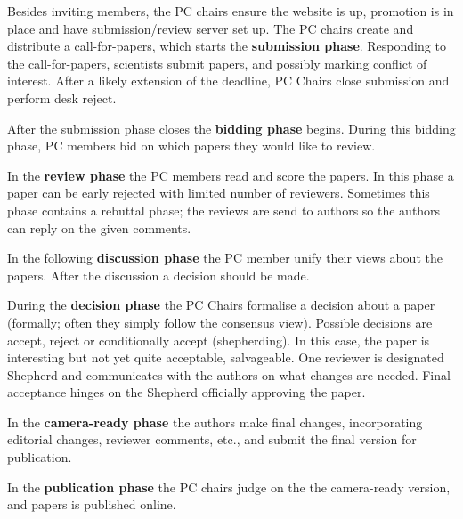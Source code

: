 \documentclass{ou-report}
\newcommand{\outline}[1]{{\color{blue} #1}}
\begin{document}
Besides inviting members, the PC chairs ensure the website is up, promotion 
is in place and have submission/review server set up.
The PC chairs create and distribute a call-for-papers, which starts the 
\textbf{submission phase}.
Responding to the call-for-papers, scientists submit papers, and possibly 
marking conflict of interest. 
After a likely extension of the deadline, PC Chairs close submission and 
perform desk reject.

After the submission phase closes the \textbf{bidding phase} begins. During 
this bidding phase, PC members bid on which papers they would like to review.

In the \textbf{review phase} the PC members read and score the papers. In this 
phase a paper can be early rejected with limited number of reviewers. Sometimes 
this phase contains a rebuttal phase; the reviews are send to authors so the 
authors can reply on the given comments.

In the following \textbf{discussion phase} the PC member unify their views about 
the papers. After the discussion a decision should be made.

During the \textbf{decision phase} the PC Chairs formalise a decision about a 
paper (formally; often they simply follow the consensus view). Possible 
decisions are accept, reject or conditionally accept (shepherding). In this 
case, the paper is interesting but not yet quite acceptable, salvageable. One 
reviewer is designated Shepherd and communicates with the authors on what 
changes are needed. Final acceptance hinges on the Shepherd officially 
approving the paper.

In the \textbf{camera-ready phase} the authors make final changes, 
incorporating editorial changes, reviewer comments, etc., and submit the final 
version for publication.

In the \textbf{publication phase} the PC chairs judge on the the camera-ready 
version, and papers is published online.


    
\end{document}
